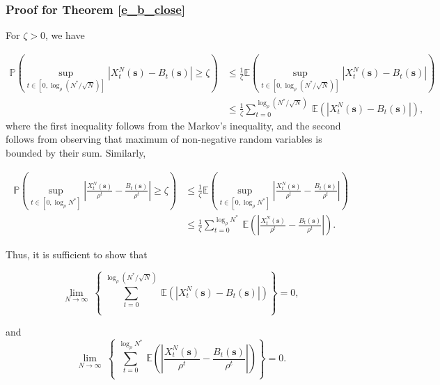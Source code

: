\documentclass{article}
\theoremstyle{definition}
\newcommand{\lrset}[1]{\left\{{#1}\right\}}
\newcommand{\lrp}[1]{\left({#1}\right)}
\newcommand{\abs}[1]{\left\lvert{#1}\right\rvert}
\newcommand{\Exp}[1]{\mathbb{E}\lrp{#1}}
\begin{document}
 










\subsubsection{Proof for Theorem \ref{e_b_close}}

  For $\zeta > 0$, we have

    \[
      \begin{aligned} 
      \mathbb{P}\lrp{ \sup\limits_{t\in[0,\log_\rho (N^*/\sqrt{N})]} \abs{{{X}}^N_t(\bm{s}) - {{B}}_t(\bm{s})} \ge \zeta }  &\le \frac{1}{\zeta} \Exp{\sup\limits_{t\in[0,\log_\rho (N^*/\sqrt{N})]} \abs{{{X}}^N_t(\bm{s}) - {{B}}_t(\bm{s})}}\\
          & \le  \frac{1}{\zeta} \sum\limits_{t=0}^{\log_\rho (N^*/\sqrt{N})} ~\Exp{\abs{{{X}}^N_t(\bm{s}) - {{B}}_t(\bm{s})}}, 
      \end{aligned}
    \]
    where the first inequality follows from the Markov's inequality, and the second follows from observing that maximum of non-negative random variables is bounded by their sum. Similarly,  

    \[ 
      \begin{aligned}
        \mathbb{P}\lrp{ \sup\limits_{t \in[0, \log_\rho N^*]} \abs{ \frac{{{X}}^N_t(\bm{s})}{\rho^t} - \frac{{{B}}_t(\bm{s})}{\rho^t} } \ge \zeta } &\le \frac{1}{\zeta} \Exp{\sup\limits_{t\in[0,\log_\rho N^*]} \abs{\frac{{{X}}^N_t(\bm{s})}{\rho^t} - \frac{{{B}}_t(\bm{s})}{\rho^t}}} \\
                &\le \frac{1}{\zeta} \sum_{t=0}^{\log_\rho N^*} ~\Exp{\abs{ \frac{{{X}}^N_t(\bm{s})}{\rho^t} - \frac{{{B}}_t(\bm{s})}{\rho^t}}}.
      \end{aligned}
    \]

    Thus, it is sufficient to show that

    \[ \lim\limits_{N\rightarrow\infty} ~ \lrset{  ~ \sum_{t=0}^{\log_\rho (N^*/\sqrt{N})} ~\Exp{\abs{{{X}}^N_t(\bm{s}) - {{B}}_t(\bm{s})}}}  = 0,\]

    and 
    \[ \lim\limits_{N\rightarrow\infty} ~ \lrset {  ~ \sum_{t=0}^{\log_\rho N^*} ~\Exp{\abs{ \frac{{{X}}^N_t(\bm{s})}{\rho^t} - \frac{{{B}}_t(\bm{s})}{\rho^t}}}} = 0. \]
\end{document}
